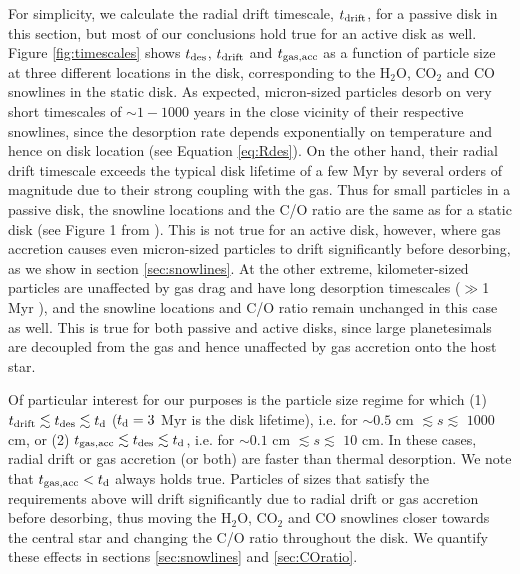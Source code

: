 \documentclass[apj]{emulateapj}
\newcommand{\emgr}[1]{\emph{ \color{gray} #1}}
\begin{document}
For simplicity, we calculate the radial drift timescale, $t_{\rm drift}$, for a passive disk in this section, but most of our conclusions hold true for an active disk as well. Figure \ref{fig:timescales} shows $t_{\rm des}$, $t_{\rm drift}$ and $t_{\rm gas, acc}$ as a function of particle size at three different locations in the disk, corresponding to the H$_2$O, CO$_2$ and CO snowlines in the static disk. As expected, micron-sized particles desorb on very short timescales of $\sim 1-1000$ years in the close vicinity of their respective snowlines, since the desorption rate depends exponentially on temperature and hence on disk location (see Equation \ref{eq:Rdes}).  On the other hand, their radial drift timescale exceeds the typical disk lifetime of a few Myr by several orders of magnitude due to their strong coupling with the gas. Thus for small particles in a passive disk, the snowline locations and the C/O ratio are the same as for a static disk (see Figure 1 from \citealt{oberg11}). This is not true for an active disk, however, where gas accretion causes even micron-sized particles to drift significantly before desorbing, as we show in section \ref{sec:snowlines}. At the other extreme, kilometer-sized particles are unaffected by gas drag and have long desorption timescales ($\gg$1 Myr ), and the snowline locations and C/O ratio remain unchanged in this case as well. This is true for both passive and active disks, since large planetesimals are decoupled from the gas and hence unaffected by gas accretion onto the host star. 

Of particular interest for our purposes is the particle size regime for which (1) $t_{\rm drift} \lesssim t_{\rm des} \lesssim t_{\rm d}$ ($t_{\rm d}=3$ Myr is the disk lifetime), i.e. for $\sim$$0.5$ cm $\lesssim s \lesssim$ $1000$ cm, or (2) $t_{\rm gas, acc} \lesssim t_{\rm des} \lesssim t_{\rm d}$, i.e. for $\sim$$0.1$ cm $\lesssim s \lesssim$ $10$ cm. In these cases, radial drift or gas accretion (or both) are faster than thermal desorption. We note that $t_{\rm gas, acc}<t_{\rm d}$ always holds true. Particles of sizes that satisfy the requirements above will drift significantly due to radial drift or gas accretion before desorbing, thus moving the H$_2$O, CO$_2$ and CO snowlines closer towards the central star and changing the C/O ratio throughout the disk. We quantify these effects in sections \ref{sec:snowlines} and \ref{sec:COratio}.



\end{document}
